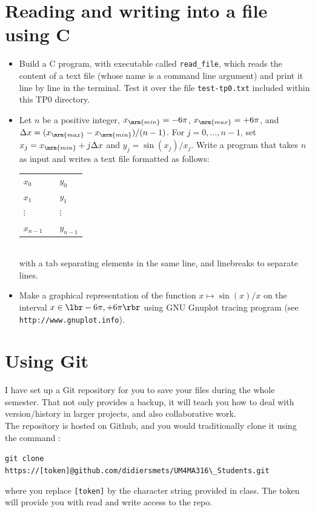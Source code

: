 \documentclass[a4paper,12pt]{article}
\begin{document}
\section{Reading and writing into a file using C}

\begin{itemize}

\item[1)] Build a C program, with executable called \texttt{read\_file},
  which reads the content of a text file (whose name is a command line argument) 
  and print it line by line in the terminal. Test it over the file 
  \texttt{test-tp0.txt} included within this TP0 directory.\\
  
\item[2)] Let $n$ be a positive integer, $x_{\mrm{min}} = -6\pi$, $x_{\mrm{max}} = +6\pi$, and $
  \Delta x = (x_{\mrm{max}}-x_{\mrm{min}})/(n-1)$. For $j=0,\dots, n-1$, set  
  $x_j = x_{\mrm{min}} + j \Delta x$ and $y_j = \sin(x_j)/x_j$. Write a program that
  takes $n$ as input and writes a text file formatted as follows:\\[10pt]
  \begin{tabular}{lll}
    $x_0$ & &$y_0$\\
    $x_1$ & &$y_1$\\
    $\vdots$ && $\vdots$\\
    $x_{n-1}$ && $y_{n-1}$\\   
  \end{tabular}
  \quad\\[10pt]
  with a tab separating elements in the same line, and linebreaks to separate lines.\\

\item[3)] Make a graphical representation of the function $x\mapsto \sin(x)/x$ on the interval 
  $x\in \lbr-6\pi,+6\pi\rbr$ using GNU Gnuplot tracing program (see \texttt{http://www.gnuplot.info}).

\end{itemize}

\section{Using Git}
I have set up a Git repository for you to save your files during the whole
semester. That not only provides a backup, it will teach you how to deal with
version/history in larger projects, and also collaborative work.\\
The repository is hosted on Github, and you would traditionally clone it
using the command :
\begin{center}
	\verb|git clone https://[token]@github.com/didiersmets/UM4MA316\_Students.git| 
\end{center}
where you replace {\tt [token]} by the character string provided in class. The
token will provide you with read and write access to the repo.
\end{document}
